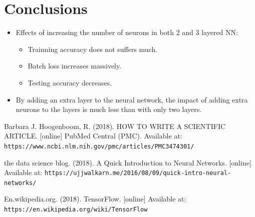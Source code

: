 \documentclass{article}
\begin{document}
\section{Conclusions}

\begin{itemize}
  \item Effects of increasing the number of neurons in both 2 and 3 layered NN:
  \begin{itemize}
    \item Trainning accuracy does not suffers much.
    \item Batch loss increases massively.
    \item Testing accuracy decreases.
  \end{itemize}
  \item By adding an extra layer to the neural network, the impact of adding extra neurons to the layers is much less than with only two layers.
\end{itemize}

\begin{thebibliography}{9}
  Barbara J. Hoogenboom, R. (2018). HOW TO WRITE A SCIENTIFIC ARTICLE. [online] PubMed Central (PMC).
  Available at: \texttt{https://www.ncbi.nlm.nih.gov/pmc/articles/PMC3474301/}

  the data science blog. (2018). A Quick Introduction to Neural Networks. [online]
  Available at: \texttt{https://ujjwalkarn.me/2016/08/09/quick-intro-neural-networks/}

  En.wikipedia.org. (2018). TensorFlow. [online]
  Available at: \texttt{https://en.wikipedia.org/wiki/TensorFlow}
  
\end{thebibliography}
\end{document}
